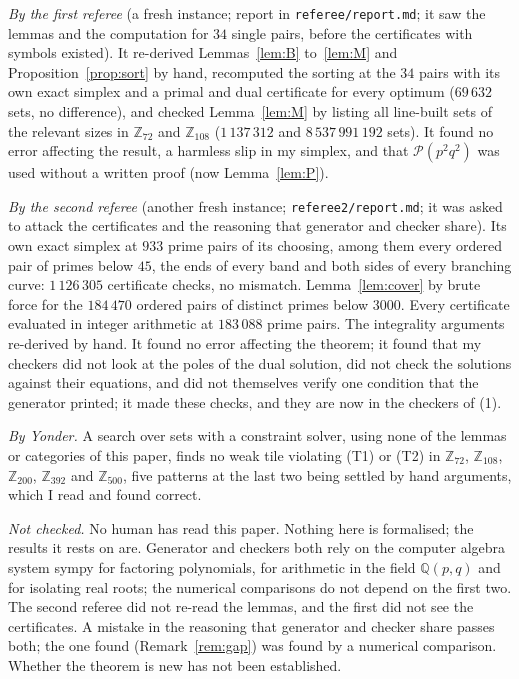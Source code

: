 \documentclass[11pt,a4paper]{amsart}
\theoremstyle{definition}
\theoremstyle{remark}
\newcommand{\Z}{\mathbb{Z}}
\newcommand{\Q}{\mathbb{Q}}
\newcommand{\PP}{\mathcal{P}}
\newcommand{\file}[1]{\texttt{#1}}
\begin{document}
\emph{By the first referee} (a fresh instance; report in \file{referee/report.md}; it saw the lemmas and the
computation for $34$ single pairs, before the certificates with symbols existed). It re-derived
Lemmas~\ref{lem:B} to~\ref{lem:M} and Proposition~\ref{prop:sort} by hand, recomputed the sorting at the $34$
pairs with its own exact simplex and a primal and dual certificate for every optimum ($69\,632$ sets, no
difference), and checked Lemma~\ref{lem:M} by listing all line-built sets of the relevant sizes in $\Z_{72}$ and
$\Z_{108}$ ($1\,137\,312$ and $8\,537\,991\,192$ sets). It found no error affecting the result, a harmless slip
in my simplex, and that $\PP(p^2q^2)$ was used without a written proof (now Lemma~\ref{lem:P}).

\emph{By the second referee} (another fresh instance; \file{referee2/report.md}; it was asked to attack the
certificates and the reasoning that generator and checker share). Its own exact simplex at $933$ prime pairs of
its choosing, among them every ordered pair of primes below $45$, the ends of every band and both sides of
every branching curve: $1\,126\,305$ certificate checks, no mismatch. Lemma~\ref{lem:cover} by brute force for
the $184\,470$ ordered pairs of distinct primes below $3000$. Every certificate evaluated in integer arithmetic
at $183\,088$ prime pairs. The integrality arguments re-derived by hand. It found no error affecting the
theorem; it found that my checkers did not look at the poles of the dual solution, did not check the solutions
against their equations, and did not themselves verify one condition that the generator printed; it made these
checks, and they are now in the checkers of (1).

\emph{By Yonder.} A search over sets with a constraint solver, using none of the lemmas or categories of this
paper, finds no weak tile violating (T1) or (T2) in $\Z_{72}$, $\Z_{108}$, $\Z_{200}$, $\Z_{392}$ and $\Z_{500}$,
five patterns at the last two being settled by hand arguments, which I read and found correct.

\emph{Not checked.} No human has read this paper. Nothing here is formalised; the results it rests on
\cite{NY,N2} are. Generator and checkers both rely on the computer algebra system sympy for factoring
polynomials, for arithmetic in the field $\Q(p,q)$ and for isolating real roots; the numerical comparisons do
not depend on the first two. The second referee did not re-read the lemmas, and the first did not see the
certificates. A mistake in the reasoning that generator and checker share passes both; the one found
(Remark~\ref{rem:gap}) was found by a numerical comparison. Whether the theorem is new has not been
established.
\end{document}
